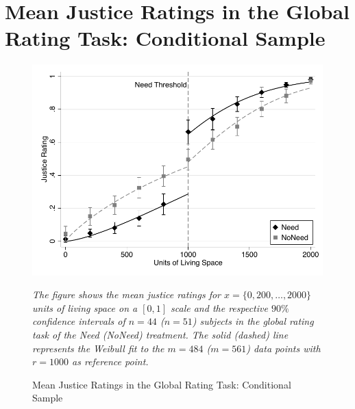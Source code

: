 \documentclass[12pt]{scrartcl}
\begin{document}
\section{Mean Justice Ratings in the Global Rating Task: Conditional Sample}\label{sec:app_conditional_absolute}
\begin{figure}[ht!]
   \centering
   \includegraphics{figures/figure_5.pdf}
   \begin{minipage}{\linewidth}
      \footnotesize
      \textit{The figure shows the mean justice ratings for $x=\{0,200,\ldots,2000\}$ units of living space on a $[0,1]$ scale and the respective $90\%$ confidence intervals of $n=44$ ($n=51$) subjects in the global rating task of the Need (NoNeed) treatment. The solid (dashed) line represents the Weibull fit to the $m=484$ ($m=561$) data points with $r=1000$ as reference point.}
   \end{minipage}
   \caption{Mean Justice Ratings in the Global Rating Task: Conditional Sample}
   \label{fig:global_ratings_conditional}
\end{figure}
\end{document}
